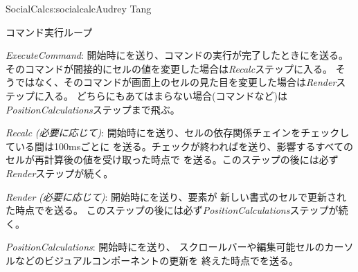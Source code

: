 \begin{aosachapter}{SocialCalc}{s:socialcalc}{Audrey Tang}
\begin{aosasect1}{コマンド実行ループ}
\begin{aosadescription}
  \item{\emph{ExecuteCommand}}:
  開始時にを送り、コマンドの実行が完了したときにを送る。
  そのコマンドが間接的にセルの値を変更した場合は\emph{Recalc}ステップに入る。
  そうではなく、そのコマンドが画面上のセルの見た目を変更した場合は\emph{Render}ステップに入る。
  どちらにもあてはまらない場合(コマンドなど)は\emph{PositionCalculations}ステップまで飛ぶ。

\pagebreak

  \item{\emph{Recalc}} \emph{(必要に応じて)}:
  開始時にを送り、セルの依存関係チェインをチェックしている間は100msごとに
  を送る。チェックが終わればを送り、影響するすべてのセルが再計算後の値を受け取った時点で
  を送る。このステップの後には必ず\emph{Render}ステップが続く。

  \item{\emph{Render}} \emph{(必要に応じて)}:
  開始時にを送り、要素が
  新しい書式のセルで更新された時点でを送る。
  このステップの後には必ず\emph{PositionCalculations}ステップが続く。

  \item{\emph{PositionCalculations}}:
  開始時にを送り、
  スクロールバーや編集可能セルのカーソルなどのビジュアルコンポーネントの更新を
  終えた時点でを送る。


\end{aosadescription}
\end{aosasect1}
\end{aosachapter}
